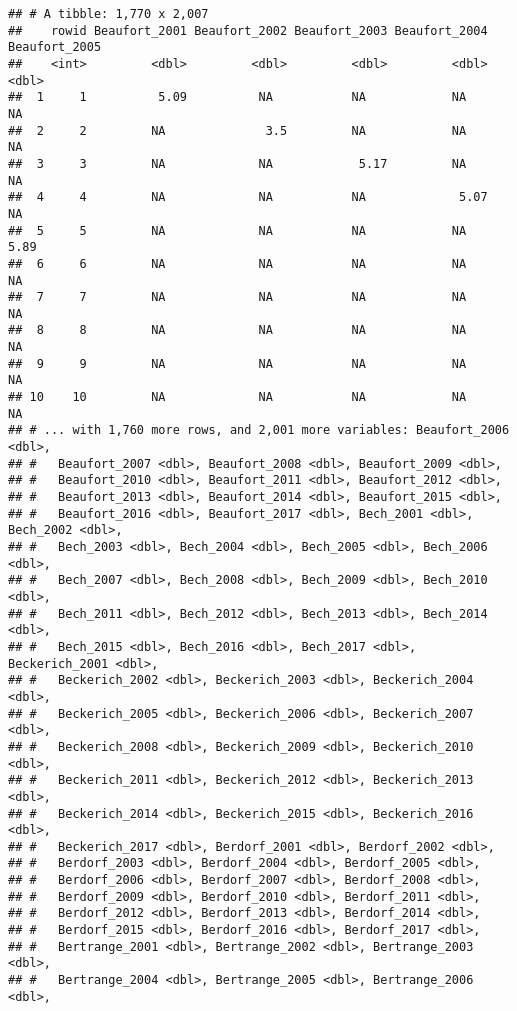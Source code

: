 \documentclass[
]{article}
\begin{document}
\begin{verbatim}
## # A tibble: 1,770 x 2,007
##    rowid Beaufort_2001 Beaufort_2002 Beaufort_2003 Beaufort_2004 Beaufort_2005
##    <int>         <dbl>         <dbl>         <dbl>         <dbl>         <dbl>
##  1     1          5.09          NA           NA            NA            NA   
##  2     2         NA              3.5         NA            NA            NA   
##  3     3         NA             NA            5.17         NA            NA   
##  4     4         NA             NA           NA             5.07         NA   
##  5     5         NA             NA           NA            NA             5.89
##  6     6         NA             NA           NA            NA            NA   
##  7     7         NA             NA           NA            NA            NA   
##  8     8         NA             NA           NA            NA            NA   
##  9     9         NA             NA           NA            NA            NA   
## 10    10         NA             NA           NA            NA            NA   
## # ... with 1,760 more rows, and 2,001 more variables: Beaufort_2006 <dbl>,
## #   Beaufort_2007 <dbl>, Beaufort_2008 <dbl>, Beaufort_2009 <dbl>,
## #   Beaufort_2010 <dbl>, Beaufort_2011 <dbl>, Beaufort_2012 <dbl>,
## #   Beaufort_2013 <dbl>, Beaufort_2014 <dbl>, Beaufort_2015 <dbl>,
## #   Beaufort_2016 <dbl>, Beaufort_2017 <dbl>, Bech_2001 <dbl>, Bech_2002 <dbl>,
## #   Bech_2003 <dbl>, Bech_2004 <dbl>, Bech_2005 <dbl>, Bech_2006 <dbl>,
## #   Bech_2007 <dbl>, Bech_2008 <dbl>, Bech_2009 <dbl>, Bech_2010 <dbl>,
## #   Bech_2011 <dbl>, Bech_2012 <dbl>, Bech_2013 <dbl>, Bech_2014 <dbl>,
## #   Bech_2015 <dbl>, Bech_2016 <dbl>, Bech_2017 <dbl>, Beckerich_2001 <dbl>,
## #   Beckerich_2002 <dbl>, Beckerich_2003 <dbl>, Beckerich_2004 <dbl>,
## #   Beckerich_2005 <dbl>, Beckerich_2006 <dbl>, Beckerich_2007 <dbl>,
## #   Beckerich_2008 <dbl>, Beckerich_2009 <dbl>, Beckerich_2010 <dbl>,
## #   Beckerich_2011 <dbl>, Beckerich_2012 <dbl>, Beckerich_2013 <dbl>,
## #   Beckerich_2014 <dbl>, Beckerich_2015 <dbl>, Beckerich_2016 <dbl>,
## #   Beckerich_2017 <dbl>, Berdorf_2001 <dbl>, Berdorf_2002 <dbl>,
## #   Berdorf_2003 <dbl>, Berdorf_2004 <dbl>, Berdorf_2005 <dbl>,
## #   Berdorf_2006 <dbl>, Berdorf_2007 <dbl>, Berdorf_2008 <dbl>,
## #   Berdorf_2009 <dbl>, Berdorf_2010 <dbl>, Berdorf_2011 <dbl>,
## #   Berdorf_2012 <dbl>, Berdorf_2013 <dbl>, Berdorf_2014 <dbl>,
## #   Berdorf_2015 <dbl>, Berdorf_2016 <dbl>, Berdorf_2017 <dbl>,
## #   Bertrange_2001 <dbl>, Bertrange_2002 <dbl>, Bertrange_2003 <dbl>,
## #   Bertrange_2004 <dbl>, Bertrange_2005 <dbl>, Bertrange_2006 <dbl>,

\end{verbatim}
\end{document}
